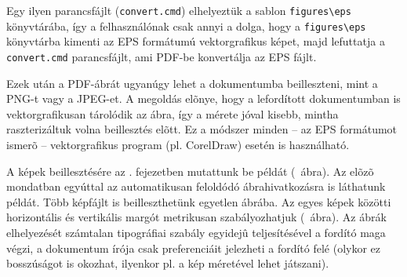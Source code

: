 Egy ilyen parancsfájlt (\verb+convert.cmd+) elhelyeztük a sablon \verb+figures\eps+ könyvtárába, így a felhasználónak csak annyi a dolga, hogy a \verb+figures\eps+ könyvtárba kimenti az EPS formátumú vektorgrafikus képet, majd lefuttatja a \verb+convert.cmd+ parancsfájlt, ami PDF-be konvertálja az EPS fájlt.

Ezek után a PDF-ábrát ugyanúgy lehet a dokumentumba beilleszteni, mint a PNG-t vagy a JPEG-et. A megoldás elõnye, hogy a lefordított dokumentumban is vektorgrafikusan tárolódik az ábra, így a mérete jóval kisebb, mintha raszterizáltuk volna beillesztés elõtt. Ez a módszer minden -- az EPS formátumot ismerõ -- vektorgrafikus program (pl. CorelDraw) esetén is használható.

A képek beillesztésére az . fejezetben mutattunk be példát (~ábra). Az elõzõ mondatban egyúttal az automatikusan feloldódó ábrahivatkozásra is láthatunk példát. Több képfájlt is beilleszthetünk egyetlen ábrába. Az egyes képek közötti horizontális és vertikális margót metrikusan szabályozhatjuk (~ábra). Az ábrák elhelyezését számtalan tipográfiai szabály egyidejû teljesítésével a fordító maga végzi, a dokumentum írója csak preferenciáit jelezheti a fordító felé (olykor ez bosszúságot is okozhat, ilyenkor pl. a kép méretével lehet játszani).

